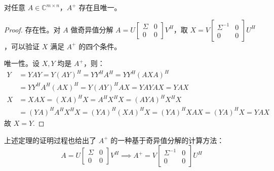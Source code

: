 \begin{theorem}
对任意 $A\in\mathbb C^{m\times n}$，$A^+$ 存在且唯一。
\end{theorem}
\begin{proof}
存在性。对 $A$ 做奇异值分解 $A=U\begin{bmatrix}\Sigma&0\\0&0\end{bmatrix}V^H$，取 $X=V\begin{bmatrix}\Sigma^{-1}&0\\0&0\end{bmatrix}U^H$，可以验证 $X$ 满足 $A^+$ 的四个条件。

唯一性。设 $X,Y$ 均是 $A^+$，则：
\begin{align*}
    Y&=YAY=Y(AY)^H=YY^HA^H=YY^H(AXA)^H\\&=YY^HA^H(AX)^H=Y(AY)^HAX=YAYAX=YAX\\
    X&=XAX=(XA)^HX=A^HX^HX=(AYA)^HX^HX\\&=(YA)^HA^HX^HX=(YA)^H(XA)^HX=(YA)^HXAX=(YA)^HX=YAX
\end{align*}
故 $X=Y$.
\end{proof}

\begin{remark}
上述定理的证明过程也给出了 $A^+$ 的一种基于奇异值分解的计算方法：
\[
    A=U\begin{bmatrix}\Sigma&0\\0&0\end{bmatrix}V^H\implies     A^+=V\begin{bmatrix}\Sigma^{-1}&0\\0&0\end{bmatrix}U^H
\]
\end{remark}

